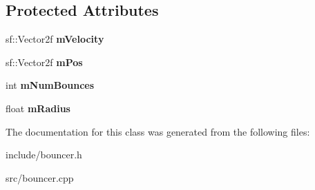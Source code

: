 \subsection*{Protected Attributes}
\begin{DoxyCompactItemize}
\item 
\mbox{\label{classssuds_1_1_bouncer_afffe3be534b592137257f8317c24bcba}} 
sf\+::\+Vector2f {\bfseries m\+Velocity}
\item 
\mbox{\label{classssuds_1_1_bouncer_aac9abece6b3859da45ff0bbe4aa2b882}} 
sf\+::\+Vector2f {\bfseries m\+Pos}
\item 
\mbox{\label{classssuds_1_1_bouncer_a48771ad9a1a9e0aadf840493653273f1}} 
int {\bfseries m\+Num\+Bounces}
\item 
\mbox{\label{classssuds_1_1_bouncer_af4f873779bbafe17b2f2def8b553640d}} 
float {\bfseries m\+Radius}
\end{DoxyCompactItemize}


The documentation for this class was generated from the following files\+:\begin{DoxyCompactItemize}
\item 
include/bouncer.\+h\item 
src/bouncer.\+cpp\end{DoxyCompactItemize}
